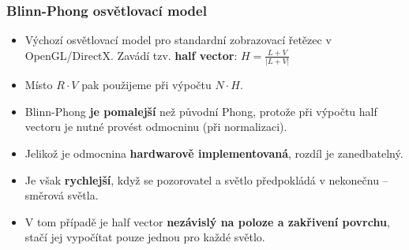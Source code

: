 \subsubsection{Blinn-Phong osvětlovací model}
\begin{itemize}
	\item Výchozí osvětlovací model pro standardní zobrazovací řetězec v OpenGL/DirectX. Zavádí tzv. \textbf{half vector}: $ H = \frac{L + V}{| L + V |}$
	\item Místo $R \cdot V$  pak použijeme při výpočtu $N \cdot H$.
	\item Blinn-Phong \textbf{je pomalejší} než původní Phong, protože při výpočtu half vectoru je nutné provést odmocninu (při normalizaci).
	\item Jelikož je odmocnina \textbf{hardwarově implementovaná}, rozdíl je zanedbatelný.
	\item Je však \textbf{rychlejší}, když se pozorovatel a světlo předpokládá v nekonečnu -- směrová světla.
	\item V tom případě je half vector \textbf{nezávislý na poloze a zakřivení povrchu}, stačí jej vypočítat pouze jednou pro každé světlo.
\end{itemize}

